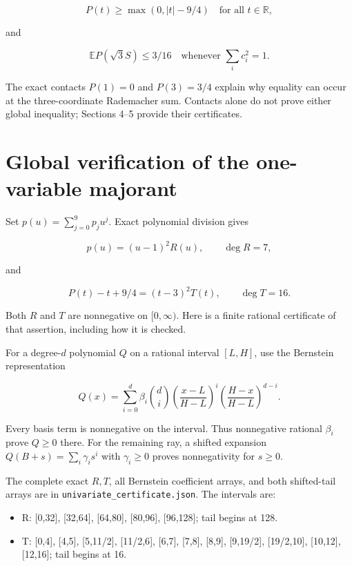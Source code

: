 \documentclass[11pt]{article}
\begin{document}
\[P(t)\ge\max(0,|t|-9/4)\quad\text{for all }t\in\mathbb R, \tag{5}\]

and

\[\mathbb E P(\sqrt3S)\le3/16\quad\text{whenever }\sum_i c_i^2=1. \tag{6}\]

The exact contacts \(P(1)=0\) and \(P(3)=3/4\)
explain why equality can occur at the three-coordinate Rademacher sum.
Contacts alone do not prove either global inequality; Sections 4--5
provide their certificates.

\hypertarget{global-verification-of-the-one-variable-majorant}{%
\section{Global verification of the one-variable
majorant}\label{global-verification-of-the-one-variable-majorant}}

Set \(p(u)=\sum_{j=0}^9p_ju^j\). Exact polynomial division gives

\[p(u)=(u-1)^2R(u),\qquad \deg R=7, \tag{7}\]

and

\[P(t)-t+9/4=(t-3)^2T(t),\qquad \deg T=16. \tag{8}\]

Both \(R\) and \(T\) are nonnegative on \([0,\infty)\). Here is a finite
rational certificate of that assertion, including how it is checked.

For a degree-\(d\) polynomial \(Q\) on a rational interval \([L,H]\),
use the Bernstein representation

\[Q(x)=\sum_{i=0}^d\beta_i\binom di
 \left(\frac{x-L}{H-L}\right)^i
 \left(\frac{H-x}{H-L}\right)^{d-i}. \tag{9}\]

Every basis term is nonnegative on the interval. Thus nonnegative
rational \(\beta_i\) prove \(Q\ge0\) there. For the remaining ray, a
shifted expansion \(Q(B+s)=\sum_i\gamma_i s^i\) with \(\gamma_i\ge0\)
proves nonnegativity for \(s\ge0\).

The complete exact \(R,T\), all Bernstein coefficient arrays, and both
shifted-tail arrays are in \texttt{univariate\_certificate.json}. The
intervals are:

\begin{itemize}
\item
  R: {[}0,32{]}, {[}32,64{]}, {[}64,80{]}, {[}80,96{]}, {[}96,128{]};
  tail begins at 128.
\item
  T: {[}0,4{]}, {[}4,5{]}, {[}5,11/2{]}, {[}11/2,6{]}, {[}6,7{]},
  {[}7,8{]}, {[}8,9{]}, {[}9,19/2{]}, {[}19/2,10{]}, {[}10,12{]},
  {[}12,16{]}; tail begins at 16.
\end{itemize}
\end{document}
